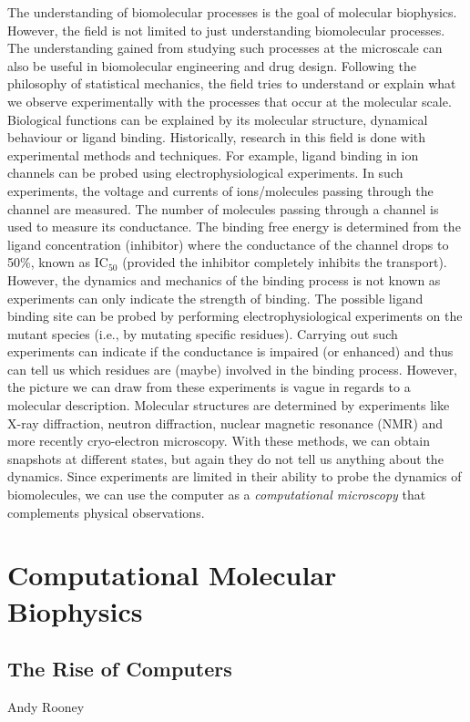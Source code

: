 The understanding of biomolecular processes is the goal of molecular biophysics. However, the 
field is not limited to just understanding biomolecular processes. The understanding gained 
from studying such processes at the microscale can also be useful in biomolecular engineering 
and drug design. Following the philosophy of statistical mechanics, the field 
tries to understand or explain what we observe experimentally with the processes that occur at 
the molecular scale. Biological functions can be explained by its molecular structure, dynamical 
behaviour or ligand binding. Historically, research in this field is done with experimental methods 
and techniques. For example, ligand binding in ion channels can be probed using electrophysiological 
experiments. In such experiments, the voltage and currents of ions/molecules passing through 
the channel are measured. The number of molecules passing through a channel is used to measure 
its conductance. The binding free energy is determined from the ligand concentration (inhibitor) 
where the conductance of the channel drops to 50\%, known as IC$_{50}$ (provided the inhibitor 
completely inhibits the transport). However, the dynamics and mechanics of the binding process 
is not known as experiments can only indicate the strength of binding. The possible ligand 
binding site can be probed by performing electrophysiological experiments on the mutant species 
(i.e., by mutating specific residues). Carrying out such experiments can indicate if the conductance 
is impaired (or enhanced) and thus can tell us which residues are (maybe) involved in the binding 
process. However, the picture we can draw from these experiments is vague in regards to a molecular 
description. Molecular structures are determined by experiments like X-ray diffraction, neutron 
diffraction, nuclear magnetic resonance (NMR) and more recently cryo-electron microscopy. With 
these methods, we can obtain snapshots at different states, but again they do not tell us anything 
about the dynamics. Since experiments are limited in their ability to probe the dynamics of 
biomolecules, we can use the computer as a \textit{computational microscopy} that complements 
physical observations.

\section{Computational Molecular Biophysics}

\subsection{The Rise of Computers}
 {Andy Rooney}

